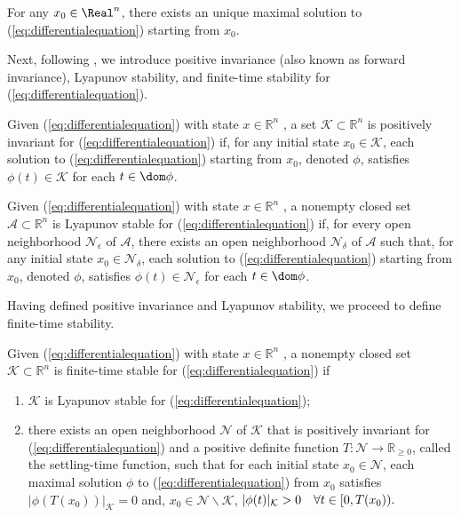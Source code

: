 {\begin{assumption}\label{assu:unimax}
    For any $x_{0}\in\Real^{n}$, there exists an unique maximal solution to (\ref{eq:differentialequation}) starting from $x_0$.
\end{assumption}
Next, following \cite{bhat2005geometric}, we introduce positive invariance (also known as forward invariance), Lyapunov stability, and finite-time stability for (\ref{eq:differentialequation}).
\begin{definition}
Given (\ref{eq:differentialequation})
with state $x\in \mathbb{R}^{n}$ , a set $\mathcal{K}\subset\mathbb{R}^{n}$ is positively invariant for (\ref{eq:differentialequation}) if, for any initial state $x_{0}\in\mathcal{K}$, each solution to (\ref{eq:differentialequation}) starting from $x_{0}$, denoted $\phi$, satisfies $\phi(t)\in\mathcal{K}$ for each $t\in\dom \phi$.
\end{definition}
\begin{definition}
Given (\ref{eq:differentialequation}) with state $x\in \mathbb{R}^{n}$ , a nonempty closed set $\mathcal{A}\subset \mathbb{R}^{n}$ is Lyapunov stable for (\ref{eq:differentialequation}) if, for every open neighborhood $\mathcal{N}_{\epsilon}$ of $\mathcal{A}$, there exists an open neighborhood $\mathcal{N}_{\delta}$ of $\mathcal{A}$ such that, for any initial state $x_{0}\in\mathcal{N}_{\delta}$, each solution to (\ref{eq:differentialequation}) starting from $x_{0}$, denoted $\phi$, satisfies $\phi(t)\in\mathcal{N}_{\epsilon}$ for each $t\in\dom \phi$.
\end{definition}

Having defined positive invariance and Lyapunov stability, we proceed to define finite-time stability.
\begin{definition}
Given (\ref{eq:differentialequation})
with state $x\in \mathbb{R}^{n}$ , a nonempty closed set $\mathcal{K}\subset \mathbb{R}^{n}$ is finite-time stable for (\ref{eq:differentialequation}) if
\begin{enumerate}
    \item $\mathcal{K}$ is Lyapunov stable for (\ref{eq:differentialequation});
    \item there exists an open neighborhood $\mathcal{N}$ of $\mathcal{K}$ that is positively invariant  for (\ref{eq:differentialequation}) and a positive definite function $T: \mathcal{N}\to \mathbb{R}_{\geq 0}$, called the settling-time function, such that\pn{,} for each initial state $x_{0}\in \mathcal{N}$, each maximal solution $\phi$ to (\ref{eq:differentialequation}) from $x_{0}$ satisfies
    $|\phi(T(x_{0}))|_{\mathcal{K}} = 0$ and,  $x_{0}\in \mathcal{N}\backslash\mathcal{K}$,
    $|\phi(t)|_{\mathcal{K}} > 0 \quad \forall t\in [0, T(x_{0})).$
\end{enumerate}
\end{definition}
}

